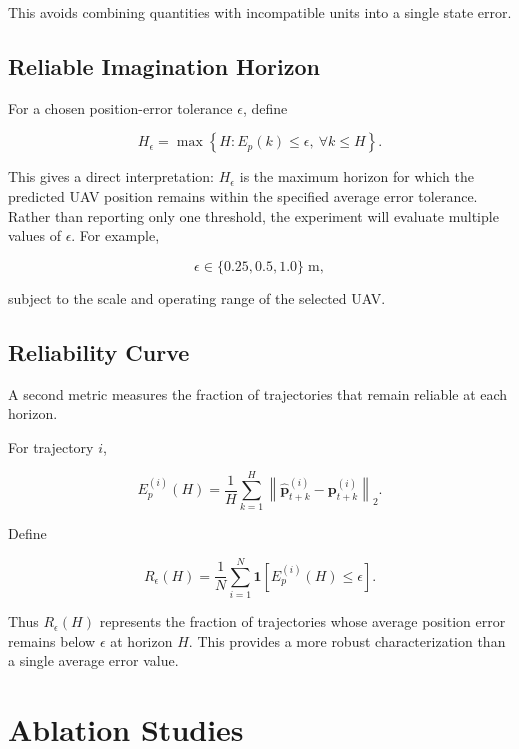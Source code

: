\documentclass[conference]{IEEEtran}
\begin{document}
This avoids combining quantities with incompatible units into a single
state error.


\subsection{Reliable Imagination Horizon}

For a chosen position-error tolerance $\epsilon$, define

\begin{equation}
H_{\epsilon}
=
\max
\left\{
H:
E_p(k)\leq\epsilon,
\ \forall k\leq H
\right\}.
\end{equation}

This gives a direct interpretation: $H_{\epsilon}$ is the maximum horizon for which the predicted UAV
position remains within the specified average error tolerance. Rather than reporting only one threshold, the experiment will evaluate multiple values of $\epsilon$. For example,

\begin{equation}
\epsilon
\in
\{0.25,0.5,1.0\}\;\mathrm{m},
\end{equation}

subject to the scale and operating range of the selected UAV.


\subsection{Reliability Curve}

A second metric measures the fraction of trajectories that remain
reliable at each horizon.

For trajectory $i$,

\begin{equation}
E_p^{(i)}(H)
=
\frac{1}{H}
\sum_{k=1}^{H}
\left\|
\hat{\mathbf p}^{(i)}_{t+k}
-
\mathbf p^{(i)}_{t+k}
\right\|_2.
\end{equation}

Define

\begin{equation}
\boxed{
R_{\epsilon}(H)
=
\frac{1}{N}
\sum_{i=1}^{N}
\mathbf{1}
\left[
E_p^{(i)}(H)\leq\epsilon
\right].
}
\end{equation}

Thus $R_{\epsilon}(H)$ represents the fraction of trajectories whose average position error remains below $\epsilon$ at horizon $H$. This provides a more robust characterization than a single average
error value.


\section{Ablation Studies}
\end{document}
